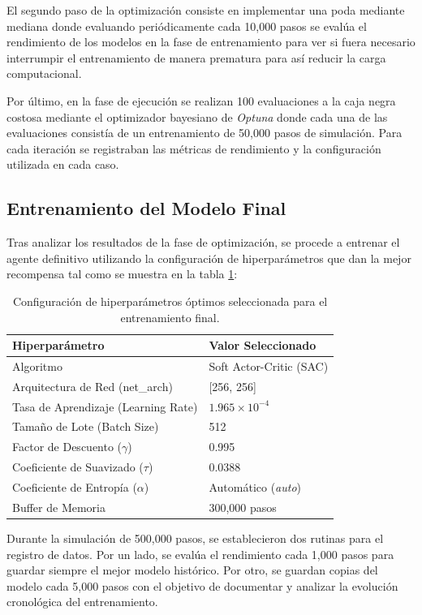 \documentclass[11pt,a4paper]{article}
\begin{document}
	El segundo paso de la optimización consiste en implementar una poda mediante mediana donde evaluando periódicamente cada 10,000 pasos se evalúa el rendimiento de los modelos en la fase de entrenamiento para ver si fuera necesario interrumpir el entrenamiento de manera prematura para así reducir la carga computacional.
	\newline
	
	Por último, en la fase de ejecución se realizan 100 evaluaciones a la caja negra costosa mediante el optimizador bayesiano de \textit{Optuna} donde cada una de las evaluaciones consistía de un entrenamiento de 50,000 pasos de simulación. Para cada iteración se registraban las métricas de rendimiento y la configuración utilizada en cada caso. 


	\subsection{Entrenamiento del Modelo Final}
	Tras analizar los resultados de la fase de optimización, se procede a entrenar el agente definitivo utilizando la configuración de hiperparámetros que dan la mejor recompensa tal como se muestra en la tabla \ref{tab:hiperparametros_finales}:
	
	\begin{table}[H]
		\centering
		\begin{tabular}{ll}
			\hline
			\textbf{Hiperparámetro} & \textbf{Valor Seleccionado} \\ \hline
			Algoritmo & Soft Actor-Critic (SAC) \\
			Arquitectura de Red (net\_arch) & [256, 256] \\
			Tasa de Aprendizaje (Learning Rate) & $1.965 \times 10^{-4}$ \\
			Tamaño de Lote (Batch Size) & 512 \\
			Factor de Descuento ($\gamma$) & 0.995 \\
			Coeficiente de Suavizado ($\tau$) & 0.0388 \\
			Coeficiente de Entropía ($\alpha$) & Automático (\textit{auto}) \\
			Buffer de Memoria & 300,000 pasos \\ \hline
		\end{tabular}
		\caption{Configuración de hiperparámetros óptimos seleccionada para el entrenamiento final.}
		\label{tab:hiperparametros_finales}
	\end{table}
	
	Durante la simulación de 500,000 pasos, se establecieron dos rutinas para el registro de datos. Por un lado, se evalúa el rendimiento cada 1,000 pasos para guardar siempre el mejor modelo histórico. Por otro, se guardan copias del modelo cada 5,000 pasos con el objetivo de documentar y analizar la evolución cronológica del entrenamiento.
\end{document}
